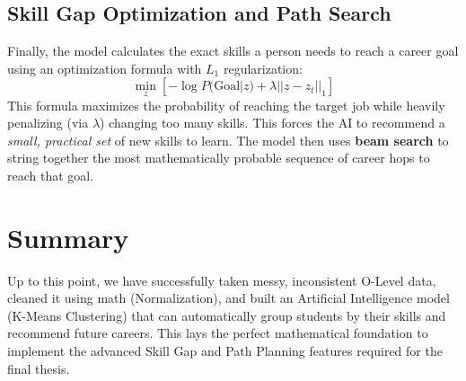 \documentclass[12pt]{article}
\begin{document}
\subsection{Skill Gap Optimization and Path Search}
Finally, the model calculates the exact skills a person needs to reach a career goal using an optimization formula with $L_1$ regularization:
\begin{equation}
    \min_{z} \left[ -\log P(\text{Goal} | z) + \lambda ||z - z_t||_1 \right]
\end{equation}
This formula maximizes the probability of reaching the target job while heavily penalizing (via $\lambda$) changing too many skills. This forces the AI to recommend a \textit{small, practical set} of new skills to learn. The model then uses \textbf{beam search} to string together the most mathematically probable sequence of career hops to reach that goal.

\section{Summary}
Up to this point, we have successfully taken messy, inconsistent O-Level data, cleaned it using math (Normalization), and built an Artificial Intelligence model (K-Means Clustering) that can automatically group students by their skills and recommend future careers. This lays the perfect mathematical foundation to implement the advanced Skill Gap and Path Planning features required for the final thesis.
\end{document}
